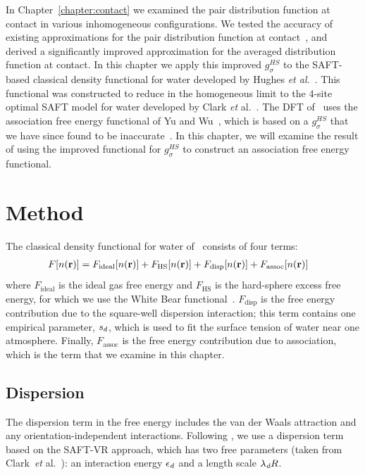In Chapter~\ref{chapter:contact} we examined the pair distribution
function at contact in various inhomogeneous configurations.  We
tested the accuracy of existing approximations for the pair
distribution function at
contact~\cite{yu2002fmt-dft-inhomogeneous-associating,
gross2009density}, and derived a significantly improved approximation
for the averaged distribution function at contact.  In this chapter we
apply this improved $g_\sigma^{HS}$ to the SAFT-based classical
density functional for water developed by Hughes \emph{et
al.}~\cite{hughes2013classical}.  This functional was constructed to
reduce in the homogeneous limit to the 4-site optimal SAFT model for
water developed by Clark \emph{et} al.~\cite{clark2006developing}.
The DFT of \hughesetal\ uses the association free energy functional of
Yu and Wu~\cite{yu2002fmt-dft-inhomogeneous-associating}, which is
based on a $g_\sigma^{HS}$ that we have since found to be
inaccurate~\cite{schulte2012using}.  In this chapter, we will examine
the result of using the improved functional for $g_\sigma^{HS}$ to
construct an association free energy functional.

\section{Method}

The classical density functional for water of \hughesetal\ consists of
four terms:
\begin{align}
  F[n(\textbf{r})] &= F_{\text{ideal}}[n(\textbf{r})] + F_{\text{HS}}[n(\textbf{r})]
  + F_{\text{disp}}[n(\textbf{r})] + F_{\text{assoc}}[n(\textbf{r})]
\end{align}
where $F_{\text{ideal}}$ is the ideal gas free energy and
$F_{\text{HS}}$ is the hard-sphere excess free energy, for which we
use the White Bear functional~\cite{roth2002whitebear}.
$F_{\text{disp}}$ is the free energy contribution due to the
square-well dispersion interaction; this term contains one empirical
parameter, $s_d$, which is used to fit the surface tension of water near one
atmosphere.  Finally, $F_{\text{assoc}}$ is the free energy
contribution due to association, which is the term that we examine in
this chapter.

\subsection{Dispersion}
The dispersion term in the free energy includes the van
der Waals attraction and any orientation-independent
interactions. Following \hughesetal, we use a dispersion term based on
the SAFT-VR approach\cite{gil-villegas-1997-SAFT-VR}, which has two
free parameters (taken from Clark~\emph{et}
  al.~\cite{clark2006developing}): an interaction energy $\epsilon_\textit{d}$
and a length scale $\lambda_\textit{d} R$.

